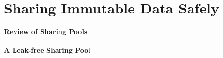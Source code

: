 %
%
%
%
%
%

\section{Sharing Immutable Data Safely}
\paragraph{Review of Sharing Pools}
\paragraph{A Leak-free Sharing Pool}
